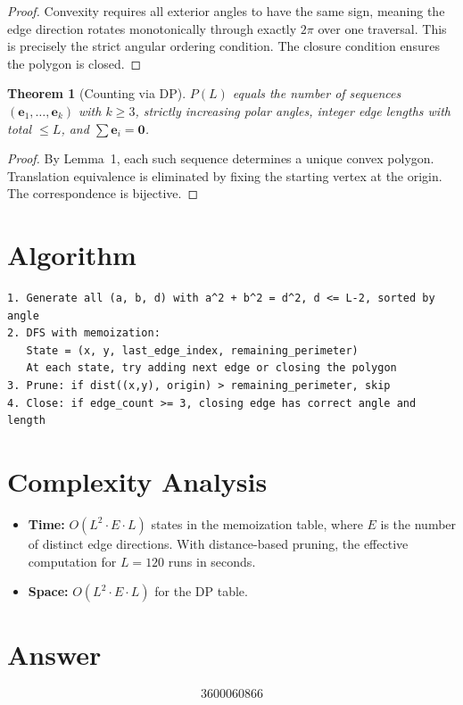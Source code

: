 \documentclass[12pt]{article}
\newtheorem{theorem}{Theorem}
\begin{document}
\begin{proof}
Convexity requires all exterior angles to have the same sign, meaning the edge direction rotates monotonically through exactly $2\pi$ over one traversal. This is precisely the strict angular ordering condition. The closure condition ensures the polygon is closed.
\end{proof}

\begin{theorem}[Counting via DP]
$P(L)$ equals the number of sequences $(\mathbf{e}_1, \ldots, \mathbf{e}_k)$ with $k \geq 3$, strictly increasing polar angles, integer edge lengths with total $\leq L$, and $\sum \mathbf{e}_i = \mathbf{0}$.
\end{theorem}

\begin{proof}
By Lemma~1, each such sequence determines a unique convex polygon. Translation equivalence is eliminated by fixing the starting vertex at the origin. The correspondence is bijective.
\end{proof}

\section{Algorithm}

\begin{verbatim}
1. Generate all (a, b, d) with a^2 + b^2 = d^2, d <= L-2, sorted by angle
2. DFS with memoization:
   State = (x, y, last_edge_index, remaining_perimeter)
   At each state, try adding next edge or closing the polygon
3. Prune: if dist((x,y), origin) > remaining_perimeter, skip
4. Close: if edge_count >= 3, closing edge has correct angle and length
\end{verbatim}

\section{Complexity Analysis}
\begin{itemize}
\item \textbf{Time:} $O(L^2 \cdot E \cdot L)$ states in the memoization table, where $E$ is the number of distinct edge directions. With distance-based pruning, the effective computation for $L = 120$ runs in seconds.
\item \textbf{Space:} $O(L^2 \cdot E \cdot L)$ for the DP table.
\end{itemize}

\section{Answer}

\[
\boxed{3600060866}
\]
\end{document}
